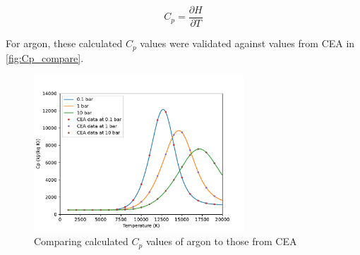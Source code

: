         \begin{equation}
            C_p = \frac{\partial H}{\partial T}
        \end{equation}
        
        For argon, these calculated $C_p$ values were validated against values from CEA \cite{CEARUNRev4} in \autoref{fig:Cp_compare}.
        
        \begin{figure}[!ht]
            \centering
            \includegraphics[width=0.7\textwidth]{assets/2 models/Cp_compare.pdf}
            \caption{Comparing calculated $C_p$ values of argon to those from CEA}
            \label{fig:Cp_compare}
        \end{figure}



